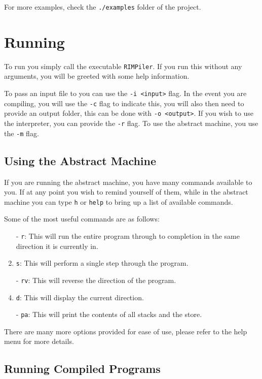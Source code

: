 For more examples, check the \lstinline{./examples} folder of the project.

\section{Running \rimp}

To run \rimp you simply call the executable \lstinline{RIMPiler}. If you run this without any arguments, you will be greeted with some help information. 

To pass an input file to \rimp you can use the \lstinline{-i <input>} flag. 
In the event you are compiling, you will use the \lstinline{-c} flag to indicate this, you will also then need to provide an output folder, this can be done with \lstinline{-o <output>}.
If you wish to use the interpreter, you can provide the \lstinline{-r} flag.
To use the abstract machine, you use the \lstinline{-m} flag.

\subsection{Using the Abstract Machine}

If you are running the abstract machine, you have many commands available to you. If at any point you wish to remind yourself of them, while in the abstract machine you can type \lstinline{h} or \lstinline{help} to bring up a list of available commands.

Some of the most useful commands are as follows:

\begin{enumerate}
    \item[-] \lstinline{r}: This will run the entire program through to completion in the same direction it is currently in.
    \item[-] \lstinline{s}: This will perform a single step through the program.
    \item[-] \lstinline{rv}: This will reverse the direction of the program.
    \item[-] \lstinline{d}: This will display the current direction.
    \item[-] \lstinline{pa}: This will print the contents of all stacks and the store.
\end{enumerate}

There are many more options provided for ease of use, please refer to the help menu for more details.

\subsection{Running Compiled Programs}

